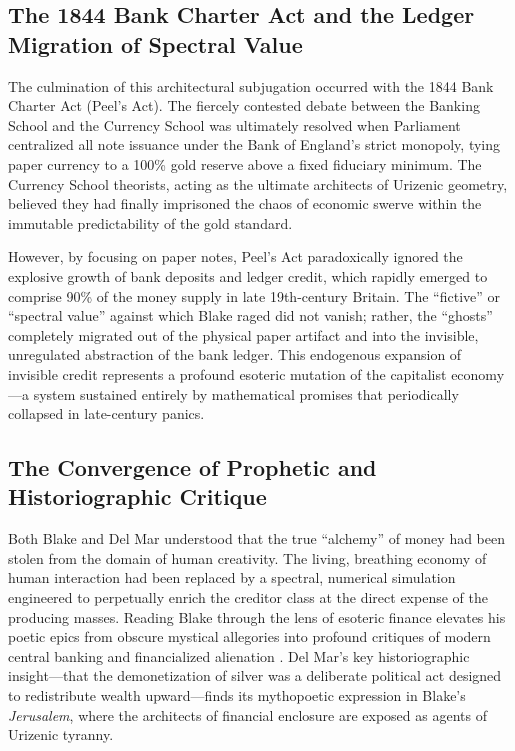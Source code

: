 \documentclass[
]{article}
\begin{document}
\subsection{The 1844 Bank Charter Act and the Ledger Migration of
Spectral
Value}\label{the-1844-bank-charter-act-and-the-ledger-migration-of-spectral-value}

The culmination of this architectural subjugation occurred with the 1844
Bank Charter Act (Peel's Act). The fiercely contested debate between the
Banking School and the Currency School was ultimately resolved when
Parliament centralized all note issuance under the Bank of England's
strict monopoly, tying paper currency to a 100\% gold reserve above a
fixed fiduciary minimum. The Currency School theorists, acting as the
ultimate architects of Urizenic geometry, believed they had finally
imprisoned the chaos of economic swerve within the immutable
predictability of the gold standard.

However, by focusing on paper notes, Peel's Act paradoxically ignored
the explosive growth of bank deposits and ledger credit, which rapidly
emerged to comprise 90\% of the money supply in late 19th-century
Britain. The ``fictive'' or ``spectral value'' against which Blake raged
did not vanish; rather, the ``ghosts'' completely migrated out of the
physical paper artifact and into the invisible, unregulated abstraction
of the bank ledger. This endogenous expansion of invisible credit
represents a profound esoteric mutation of the capitalist economy---a
system sustained entirely by mathematical promises that periodically
collapsed in late-century panics.

\subsection{The Convergence of Prophetic and Historiographic
Critique}\label{the-convergence-of-prophetic-and-historiographic-critique}

Both Blake and Del Mar understood that the true ``alchemy'' of money had
been stolen from the domain of human creativity. The living, breathing
economy of human interaction had been replaced by a spectral, numerical
simulation engineered to perpetually enrich the creditor class at the
direct expense of the producing masses. Reading Blake through the lens
of esoteric finance elevates his poetic epics from obscure mystical
allegories into profound critiques of modern central banking and
financialized alienation \citep{poovey2008genres, baucom2005specters}.
Del Mar's key historiographic insight---that the demonetization of
silver was a deliberate political act designed to redistribute wealth
upward---finds its mythopoetic expression in Blake's \emph{Jerusalem},
where the architects of financial enclosure are exposed as agents of
Urizenic tyranny.
\end{document}

